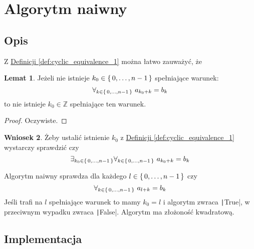 \documentclass{scrartcl}
\theoremstyle{definition}
\theoremstyle{definition}
\newtheorem{lemma_k0_values}{Lemat}[section]
\newtheorem{less_k0_values_to_check}[lemma_k0_values]{Wniosek}
\begin{document}
\section{Algorytm naiwny}
\subsection{Opis}
Z \hyperref[def:cyclic_equivalence_1]
{Definicji \ref*{def:cyclic_equivalence_1}}
można łatwo zauważyć, że
\begin{lemma_k0_values}
    \label{lem:lemma_k0_values}
    Jeżeli nie istnieje
    \(k_0\in\set{0,\ldots, n-1}\) spełniające warunek:
    \[\forall_{k\in\set{0,\ldots,n-1}}\ a_{k_0+k}=b_k\]
    to nie istnieje \(k_0\in\mathbb{Z}\) spełniające ten warunek.
\end{lemma_k0_values}
\begin{proof}
    Oczywiste.
\end{proof}
\begin{less_k0_values_to_check}
    \label{cor:less_k0_values_to_check}
    Żeby ustalić istnienie \(k_0\) z
    \hyperref[def:cyclic_equivalence_1]
    {Definicji \ref*{def:cyclic_equivalence_1}}
    wystarczy sprawdzić czy
    \[\exists_{k_0\in\set{0,\ldots,n-1}}
        \forall_{k\in\set{0,\ldots,n-1}}\ a_{k_0+k}=b_k\]
\end{less_k0_values_to_check}

Algorytm naiwny sprawdza dla każdego \(l\in\set{0,\ldots,n-1}\)
czy \[\forall_{k\in\set{0,\ldots,n-1}}\ a_{l+k}=b_k\]
Jeśli trafi na \(l\) spełniające warunek
to mamy \(k_0=l\)
i algorytm zwraca \texttt|True|,
w przeciwnym wypadku zwraca \texttt|False|.
Algorytm ma złożoność kwadratową.\cite{wazniakmimuw}
\subsection{Implementacja}
\inputminted{python3}{naive.py}
\pagebreak
\printbibliography[heading=bibintoc]
\end{document}

